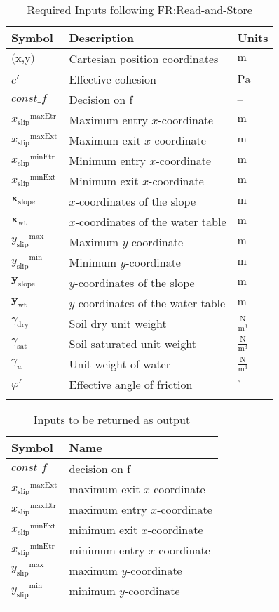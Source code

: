 \documentclass[12pt]{article}
\begin{document}
\begin{longtable}{l l l}
\toprule
\textbf{Symbol} & \textbf{Description} & \textbf{Units}
\\
\midrule
\endhead
$\text{(x,y)}$ & Cartesian position coordinates & ${\text{m}}$
\\
$c'$ & Effective cohesion & ${\text{Pa}}$
\\
$\mathit{const\_f}$ & Decision on f & --
\\
${{x_{\text{slip}}}^{\text{maxEtr}}}$ & Maximum entry $x$-coordinate & ${\text{m}}$
\\
${{x_{\text{slip}}}^{\text{maxExt}}}$ & Maximum exit $x$-coordinate & ${\text{m}}$
\\
${{x_{\text{slip}}}^{\text{minEtr}}}$ & Minimum entry $x$-coordinate & ${\text{m}}$
\\
${{x_{\text{slip}}}^{\text{minExt}}}$ & Minimum exit $x$-coordinate & ${\text{m}}$
\\
${\symbf{x}_{\text{slope}}}$ & $x$-coordinates of the slope & ${\text{m}}$
\\
${\symbf{x}_{\text{wt}}}$ & $x$-coordinates of the water table & ${\text{m}}$
\\
${{y_{\text{slip}}}^{\text{max}}}$ & Maximum $y$-coordinate & ${\text{m}}$
\\
${{y_{\text{slip}}}^{\text{min}}}$ & Minimum $y$-coordinate & ${\text{m}}$
\\
${\symbf{y}_{\text{slope}}}$ & $y$-coordinates of the slope & ${\text{m}}$
\\
${\symbf{y}_{\text{wt}}}$ & $y$-coordinates of the water table & ${\text{m}}$
\\
${γ_{\text{dry}}}$ & Soil dry unit weight & $\frac{\text{N}}{\text{m}^{3}}$
\\
${γ_{\text{sat}}}$ & Soil saturated unit weight & $\frac{\text{N}}{\text{m}^{3}}$
\\
${γ_{w}}$ & Unit weight of water & $\frac{\text{N}}{\text{m}^{3}}$
\\
$φ'$ & Effective angle of friction & ${{}^{\circ}}$
\\
\bottomrule
\caption{Required Inputs following \hyperref[readAndStore]{FR:Read-and-Store}}
\label{Table:ReqInputs}
\end{longtable}
\begin{longtable}{l l}
\toprule
\textbf{Symbol} & \textbf{Name}
\\
\midrule
\endhead
$\mathit{const\_f}$ & decision on f
\\
${{x_{\text{slip}}}^{\text{maxExt}}}$ & maximum exit $x$-coordinate
\\
${{x_{\text{slip}}}^{\text{maxEtr}}}$ & maximum entry $x$-coordinate
\\
${{x_{\text{slip}}}^{\text{minExt}}}$ & minimum exit $x$-coordinate
\\
${{x_{\text{slip}}}^{\text{minEtr}}}$ & minimum entry $x$-coordinate
\\
${{y_{\text{slip}}}^{\text{max}}}$ & maximum $y$-coordinate
\\
${{y_{\text{slip}}}^{\text{min}}}$ & minimum $y$-coordinate
\\
\bottomrule
\caption{Inputs to be returned as output}
\label{Table:inputsToOutputTable}
\end{longtable}
\end{document}
